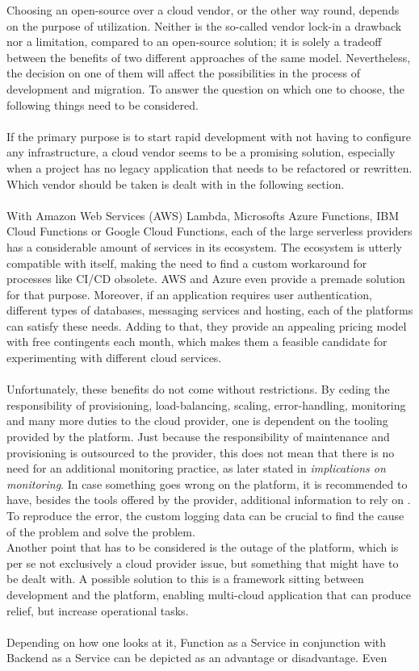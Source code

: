 \documentclass[a4paper,11pt, pagesize]{scrartcl}
\begin{document}
\begin{spacing}{1.2}
Choosing an open-source over a cloud vendor, or the other way round, depends on the purpose of utilization. Neither is the so-called vendor lock-in a drawback nor a limitation, compared to an open-source solution; it is solely a tradeoff between the benefits of two different approaches of the same model. Nevertheless, the decision on one of them will affect the possibilities in the process of development and migration. To answer the question on which one to choose, the following things need to be considered.\\\\ If the primary purpose is to start rapid development with not having to configure any infrastructure, a cloud vendor seems to be a promising solution, especially when a project has no legacy application that needs to be refactored or rewritten. Which vendor should be taken is dealt with in the following section.\\\\ With Amazon Web Services (AWS) Lambda, Microsofts Azure Functions, IBM Cloud Functions or Google Cloud Functions, each of the large serverless providers has a considerable amount of services in its ecosystem. The ecosystem is utterly compatible with itself, making the need to find a custom workaround for processes like CI/CD obsolete. AWS and Azure even provide a premade solution for that purpose. Moreover, if an application requires user authentication, different types of databases, messaging services and hosting, each of the platforms can satisfy these needs. Adding to that, they provide an appealing pricing model with free contingents each month, which makes them a feasible candidate for experimenting with different cloud services.\\\\ Unfortunately, these benefits do not come without restrictions. By ceding the responsibility of provisioning, load-balancing, scaling, error-handling, monitoring and many more duties to the cloud provider, one is dependent on the tooling provided by the platform. Just because the responsibility of maintenance and provisioning is outsourced to the provider, this does not mean that there is no need for an additional monitoring practice, as later stated in \textit{implications on monitoring}. In case something goes wrong on the platform, it is recommended to have, besides the tools offered by the provider, additional information to rely on \cite{manner2019troubleshooting}. To reproduce the error, the custom logging data can be crucial to find the cause of the problem and solve the problem.\\Another point that has to be considered is the outage of the platform, which is per se not exclusively a cloud provider issue, but something that might have to be dealt with. A possible solution to this is a framework sitting between development and the platform, enabling multi-cloud application that can produce relief, but increase operational tasks.\\\\ Depending on how one looks at it, Function as a Service in conjunction with Backend as a Service can be depicted as an advantage or disadvantage. Even 
\end{spacing}
\end{document}
